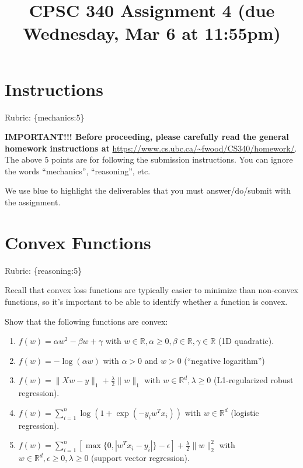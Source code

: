 \documentclass{article}
\def\rubric#1{\gre{Rubric: \{#1\}}}{}
\def\blu#1{{\color{blu}#1}}
\def\gre#1{{\color{gre}#1}}
\def\norm#1{\|#1\|}
\def\R{\mathbb{R}}
\def\enum#1{\begin{enumerate}#1\end{enumerate}}
\begin{document}
\title{CPSC 340 Assignment 4 (due Wednesday, Mar 6 at 11:55pm)}
\date{}
\maketitle

\vspace{-7em}


\section*{Instructions}
\rubric{mechanics:5}

\textbf{IMPORTANT!!! Before proceeding, please carefully read the general homework instructions at} \url{https://www.cs.ubc.ca/~fwood/CS340/homework/}. The above 5 points are for following the submission instructions. You can ignore the words ``mechanics'', ``reasoning'', etc.

\vspace{1em}
We use \blu{blue} to highlight the deliverables that you must answer/do/submit with the assignment.


\section{Convex Functions}
\rubric{reasoning:5}

Recall that convex loss functions are typically easier to minimize than non-convex functions, so it's important to be able to identify whether a function is convex.

\blu{Show that the following functions are convex}:

\enum{
\item $f(w) = \alpha w^2 - \beta w + \gamma$ with $w \in \R, \alpha \geq 0, \beta \in \R, \gamma \in \R$ (1D quadratic).
\item $f(w) = -\log(\alpha w) $ with $\alpha > 0$ and $w > 0$ (``negative logarithm'')
\item $f(w) = \norm{Xw-y}_1 + \frac{\lambda}{2}\norm{w}_1$ with $w \in \R^d, \lambda \geq 0$ (L1-regularized robust regression).
\item $f(w) = \sum_{i=1}^n \log(1+\exp(-y_iw^Tx_i)) $ with $w \in \R^d$ (logistic regression).
\item $f(w) = \sum_{i=1}^n[\max\{0,|w^Tx_i - y_i|\} - \epsilon] + \frac{\lambda}{2}\norm{w}_2^2$  with $w \in \R^d, \epsilon \geq 0, \lambda \geq 0$ (support vector regression).
}
\end{document}
